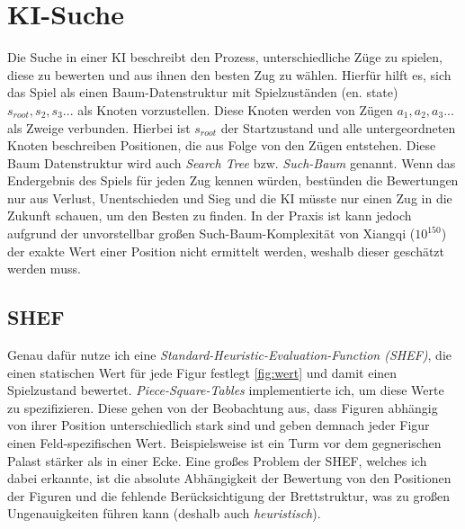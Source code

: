 \documentclass{jpp}
\begin{document}
\section{KI-Suche}
Die Suche in einer KI beschreibt den Prozess, unterschiedliche Züge zu spielen, diese zu bewerten und aus ihnen den besten Zug zu wählen. Hierfür hilft es, sich das Spiel als einen Baum-Datenstruktur mit Spielzuständen (en. state) {$s_{root}, s_2, s_3 ...$} als Knoten vorzustellen. Diese Knoten werden von Zügen {$a_1, a_2, a_3 ...$} als Zweige verbunden. Hierbei ist $s_{root}$ der Startzustand und alle untergeordneten Knoten beschreiben Positionen, die aus Folge von den Zügen entstehen. Diese Baum Datenstruktur wird auch \textit{Search Tree} bzw. \textit{Such-Baum} genannt. 
Wenn das Endergebnis des Spiels für jeden Zug kennen würden, bestünden die Bewertungen nur aus Verlust, Unentschieden und Sieg und die KI müsste nur einen Zug in die Zukunft schauen, um den Besten zu finden. In der Praxis ist kann jedoch aufgrund der unvorstellbar großen Such-Baum-Komplexität von Xiangqi ($10^{150}$) der exakte Wert einer Position nicht ermittelt werden, weshalb dieser geschätzt werden muss.

\subsection{SHEF}
Genau dafür nutze ich eine \textit{Standard-Heuristic-Evaluation-Function (SHEF)}, die einen statischen Wert für jede Figur festlegt \ref{fig:wert} und damit einen Spielzustand bewertet.
\textit{Piece-Square-Tables} implementierte ich, um diese Werte zu spezifizieren. Diese gehen von der Beobachtung aus, dass Figuren abhängig von ihrer Position unterschiedlich stark sind und geben demnach jeder Figur einen Feld-spezifischen Wert. Beispielsweise ist ein Turm vor dem gegnerischen Palast stärker als in einer Ecke. Eine großes Problem der SHEF, welches ich dabei erkannte, ist die absolute Abhängigkeit der Bewertung von den Positionen der Figuren und die fehlende Berücksichtigung der Brettstruktur, was zu großen Ungenauigkeiten führen kann (deshalb auch \textit{heuristisch}).
\end{document}
